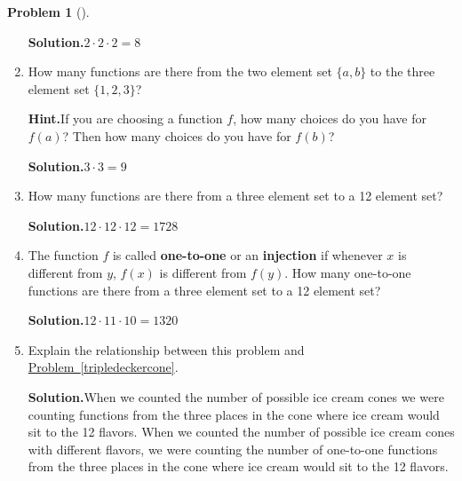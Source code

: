 \documentclass[10pt,]{book}
\newcommand{\terminology}[1]{\textbf{#1}}
\theoremstyle{plain}
\theoremstyle{definition}
\newtheorem{activity}[project]{Problem}
\theoremstyle{definition}
\numberwithin{equation}{chapter}
\begin{document}
\begin{activity}[]
\begin{enumerate}[font=\bfseries,label=(\alph*),ref=\alph*]
\textbf{Solution.}\quad \(2\cdot2\cdot2 = 8\)%
\item\label{task-7} How many functions are there from the two element set \(\{a,b\}\) to the three element set \(\{1,2,3\}\)?%
\par\medskip\noindent%
\textbf{Hint.}\quad If you are choosing a function \(f\), how many choices do you have for \(f(a)\)? Then how many choices do you have for \(f(b)\)?%
\par\medskip\noindent%
\textbf{Solution.}\quad \(3\cdot3=9\)%
\item\label{task-8} How many functions are there from a three element set to a 12 element set?%
\par\medskip\noindent%
\textbf{Solution.}\quad \(12\cdot 12\cdot 12 = 1728\)%
\item\label{task-9} The function \(f\) is called \terminology{one-to-one} or an \terminology{injection} if whenever \(x\) is different from \(y\), \(f(x)\) is different from \(f(y)\).  How many one-to-one functions are there from a three element set to a  12 element set?%
\par\medskip\noindent%
\textbf{Solution.}\quad \(12\cdot 11 \cdot 10= 1320\)%
\item\label{task-10} Explain the relationship between this problem and \hyperref[tripledeckercone]{Problem~\ref{tripledeckercone}}.%
\par\medskip\noindent%
\textbf{Solution.}\quad When we counted the number of possible ice cream cones we were counting functions from the three places in the cone where ice cream would sit to the 12 flavors. When we counted the number of possible ice cream cones with different flavors, we were counting the number of one-to-one functions from the three places in the cone where ice cream would sit to the 12 flavors.%
\end{enumerate}
\end{activity}
\end{document}
